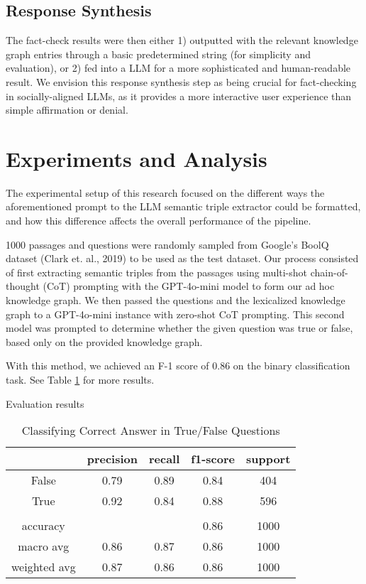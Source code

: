 \documentclass[11pt]{article}
\begin{document}
\subsection{Response Synthesis}
The fact-check results were then either 1) outputted with the relevant knowledge graph entries through a basic predetermined string (for simplicity and evaluation), or 2) fed into a LLM for a more sophisticated and human-readable result. We envision this response synthesis step as being crucial for fact-checking in socially-aligned LLMs, as it provides a more interactive user experience than simple affirmation or denial.

\section{Experiments and Analysis}
The experimental setup of this research focused on the different ways the aforementioned prompt to the LLM semantic triple extractor could be formatted, and how this difference affects the overall performance of the pipeline.

1000 passages and questions were randomly sampled from Google's BoolQ dataset (Clark et. al., 2019) to be used as the test dataset. Our process consisted of first extracting semantic triples from the passages using multi-shot chain-of-thought (CoT) prompting with the GPT-4o-mini model to form our ad hoc knowledge graph. We then passed the questions and the lexicalized knowledge graph to a GPT-4o-mini instance with zero-shot CoT prompting. This second model was prompted to determine whether the given question was true or false, based only on the provided knowledge graph.

With this method, we achieved an F-1 score of 0.86 on the binary classification task. See Table \ref{tab:result} for more results.

\begin{table}[ht]
    \centering
    \caption{Evaluation results}
    
    \caption*{Classifying Correct Answer in True/False Questions}
    \begin{tabular*}{\columnwidth}{c|c|c|c|c}
        \hline
         & precision & recall & f1-score & support \\
        \hline
        False & 0.79 & 0.89 & 0.84 & 404 \\
        True & 0.92 & 0.84 & 0.88 & 596 \\
         &  &  &  & \\
        accuracy &  &  & 0.86 & 1000 \\
        macro avg & 0.86 & 0.87 & 0.86 & 1000 \\
        weighted avg & 0.87 & 0.86 & 0.86 & 1000 \\
        \hline
    \end{tabular*}
    
    \label{tab:result}
\end{table}
\end{document}
